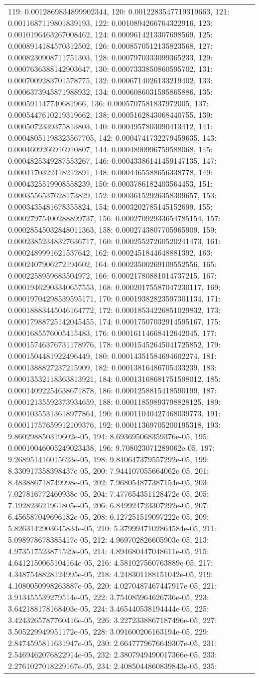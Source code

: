 \begin{tabular}{lrl}
119: 0.0012869834899902344, 120: 0.0012283547719319663, 121: 0.0011687119801839193, 122: 0.0010894266764322916, 123: 0.0010196463267008462, 124: 0.0009614213307698569, 125: 0.0008914184570312502, 126: 0.0008570512135823568, 127: 0.0008230908711751303, 128: 0.0007970333099365233, 129: 0.0007636388142903647, 130: 0.0007333850860595702, 131: 0.0007009283701578775, 132: 0.0006714026133219402, 133: 0.0006373945871988932, 134: 0.0006086031595865886, 135: 0.000591147740681966, 136: 0.0005707581837972005, 137: 0.0005447610219319662, 138: 0.0005162843068440755, 139: 0.0005072339375813803, 140: 0.0004957803090413412, 141: 0.00048051198323567705, 142: 0.0004741732279459635, 143: 0.0004609266916910807, 144: 0.0004890996759588068, 145: 0.0004825349287553267, 146: 0.00043386141459147135, 147: 0.0004170322418212891, 148: 0.0004465588656338778, 149: 0.0004325519908558239, 150: 0.0003786182403564453, 151: 0.0003556537628173829, 152: 0.00036152926358309657, 153: 0.0003435481678355824, 154: 0.0003202785145152699, 155: 0.00027975400288899737, 156: 0.00027092933654785154, 157: 0.00028545032848011363, 158: 0.0002743807705965909, 159: 0.00023852348327636717, 160: 0.00025527260520241473, 161: 0.0002489991621537642, 162: 0.0002451844648881392, 163: 0.0002407906272194602, 164: 0.00023500269109552556, 165: 0.0002258959683504972, 166: 0.00021780881014737215, 167: 0.00019462903340657553, 168: 0.00020175587047230117, 169: 0.00019704298539595171, 170: 0.00019382823597301134, 171: 0.00018883445046164772, 172: 0.00018534226851029832, 173: 0.00017988725142045455, 174: 0.00017507032914595167, 175: 0.0001685576005415483, 176: 0.00016114668412642045, 177: 0.00015746376731178976, 178: 0.00015452645041725852, 179: 0.0001504481922496449, 180: 0.00014351584694602274, 181: 0.0001388827237215909, 182: 0.00013816486705433239, 183: 0.00013532118363813921, 184: 0.00013168681751598012, 185: 0.00014092254638671878, 186: 0.0001258815418590199, 187: 0.00012135592373934659, 188: 0.00011859893798828125, 189: 0.00010355313618977864, 190: 0.00011040427468039773, 191: 0.00011757659912109376, 192: 0.00011369705200195318, 193: 9.860298850319602e-05, 194: 8.693695068359376e-05, 195: 0.00010046005249023438, 196: 9.708023071289062e-05, 197: 9.268951416015623e-05, 198: 9.840647379557292e-05, 199: 8.330917358398437e-05, 200: 7.944107055664062e-05, 201: 8.483886718749998e-05, 202: 7.968054877387154e-05, 203: 7.027816772460938e-05, 204: 7.477654351128472e-05, 205: 7.192823621961805e-05, 206: 6.849924723307292e-05, 207: 6.456587049696182e-05, 208: 6.127251519097222e-05, 209: 5.8263142903645834e-05, 210: 5.3799947102864584e-05, 211: 5.098978678385417e-05, 212: 4.969702826605903e-05, 213: 4.973517523871529e-05, 214: 4.894680447048611e-05, 215: 4.6412150065104164e-05, 216: 4.581027560763889e-05, 217: 4.3487548828124995e-05, 218: 4.248301188151042e-05, 219: 4.1080050998263887e-05, 220: 4.0270487467447917e-05, 221: 3.913455539279514e-05, 222: 3.754085964626736e-05, 223: 3.642188178168403e-05, 224: 3.465440538194444e-05, 225: 3.4243265787760416e-05, 226: 3.2272338867187496e-05, 227: 3.505229949951172e-05, 228: 3.091600206163194e-05, 229: 2.8474595811631947e-05, 230: 2.6647779676649307e-05, 231: 2.5469462076822914e-05, 232: 2.3807949490017366e-05, 233: 2.2761027018229167e-05, 234: 2.4085044860839843e-05, 235: 
\end{tabular}
